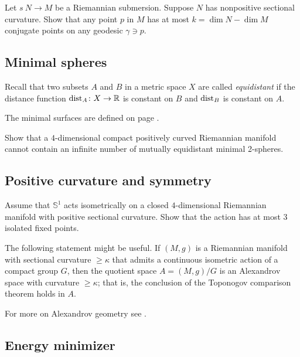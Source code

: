 \begin{pr}
Let $s\:N\to M$ be a Riemannian submersion.
Suppose $N$ has nonpositive sectional curvature.
Show that any point $p$ in $M$ has at most $k=\dim N-\dim M$ conjugate points on any geodesic $\gamma\ni p$.
\end{pr}

\subsection*{Minimal spheres}
\label{Minimal spheres}

Recall that two subsets $A$ and $B$ in a metric space $X$ are called \emph{equidistant} if the distance function $\operatorname{\rm dist}\nolimits_A\colon X\to\mathbb{R}$ is constant on $B$ and $\operatorname{\rm dist}\nolimits_B$ is constant on $A$.

The minimal surfaces are defined on page \pageref{minimal surface}.

\begin{pr}
Show that a 
$4$-dimensional
compact 
positively curved 
Riemannian manifold 
cannot contain an infinite number of  mutually
 equidistant minimal 2-spheres.
\end{pr}


\subsection*{Positive curvature and symmetry\thm}
\label{kleiner-hopf} 

\begin{pr}
Assume that $\mathbb S^1$ acts isometrically on a closed $4$-dimensional Riemannian manifold with positive sectional curvature.
Show that the action 
has at most $3$ isolated fixed points.
\end{pr}

The following statement might be useful.
If $(M,g)$ is a Riemannian manifold with sectional curvature $\ge \kappa$ that admits a continuous isometric action of a compact group $G$, 
then the quotient space $A=(M,g)/G$ is an Alexandrov space with curvature $\ge \kappa$;
that is, the conclusion of the Toponogov comparison theorem holds in $A$. 

For more on Alexandrov geometry see \cite{akp}.

\subsection*{Energy minimizer}
\label{Energy minimizer}

